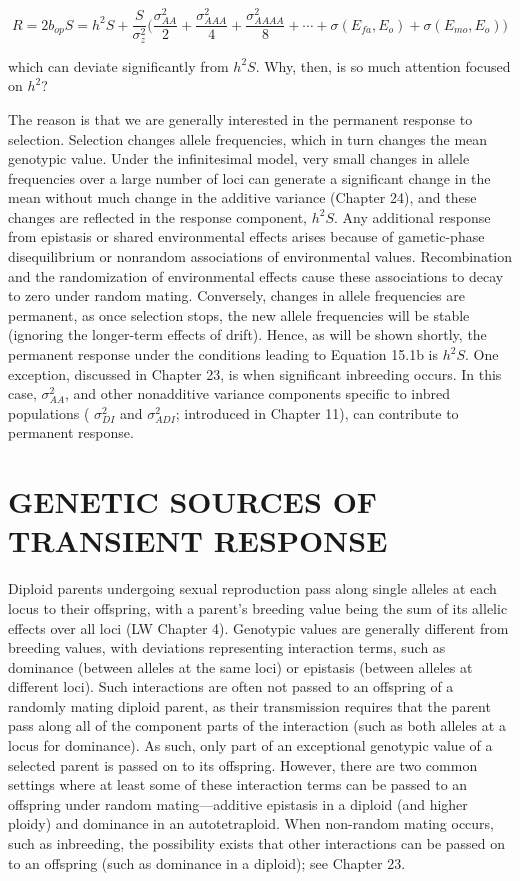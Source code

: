 \documentclass{article}
\begin{document}
\begin{equation}
R=2b_{op}S=h^{2}S+\frac{S}{\sigma_{z}^{2}}\bigg(\frac{\sigma_{AA}^{2}}{2}+\frac{\sigma_{AAA}^{2}}{4}+\frac{\sigma_{AAAA}^{2}}{8}+\cdots+\sigma(E_{fa},E_{o})+\sigma(E_{mo},E_{o})\bigg)
\tag{15.1b}
\label{eq:15_1b}
\end{equation}

which can deviate significantly from  $ h^{2}S $. Why, then, is so much attention focused on  $ h^{2} $?

The reason is that we are generally interested in the permanent response to selection. Selection changes allele frequencies, which in turn changes the mean genotypic value. Under the infinitesimal model, very small changes in allele frequencies over a large number of loci can generate a significant change in the mean without much change in the additive variance (Chapter 24), and these changes are reflected in the response component,  $ h^{2}S $. Any additional response from epistasis or shared environmental effects arises because of gametic-phase disequilibrium or nonrandom associations of environmental values. Recombination and the randomization of environmental effects cause these associations to decay to zero under random mating. Conversely, changes in allele frequencies are permanent, as once selection stops, the new allele frequencies will be stable (ignoring the longer-term effects of drift). Hence, as will be shown shortly, the permanent response under the conditions leading to Equation 15.1b is  $ h^{2}S $. One exception, discussed in Chapter 23, is when significant inbreeding occurs. In this case,  $ \sigma_{AA}^{2} $, and other nonadditive variance components specific to inbred populations ( $ \sigma_{DI}^{2} $ and  $ \sigma_{ADI}^{2} $; introduced in Chapter 11), can contribute to permanent response.

\section{GENETIC SOURCES OF TRANSIENT RESPONSE}
Diploid parents undergoing sexual reproduction pass along single alleles at each locus to their offspring, with a parent's breeding value being the sum of its allelic effects over all loci (LW Chapter 4). Genotypic values are generally different from breeding values, with deviations representing interaction terms, such as dominance (between alleles at the same loci) or epistasis (between alleles at different loci). Such interactions are often not passed to an offspring of a randomly mating diploid parent, as their transmission requires that the parent pass along all of the component parts of the interaction (such as both alleles at a locus for dominance). As such, only part of an exceptional genotypic value of a selected parent is passed on to its offspring. However, there are two common settings where at least some of these interaction terms can be passed to an offspring under random mating—additive epistasis in a diploid (and higher ploidy) and dominance in an autotetraploid. When non-random mating occurs, such as inbreeding, the possibility exists that other interactions can be passed on to an offspring (such as dominance in a diploid); see Chapter 23.
\end{document}
